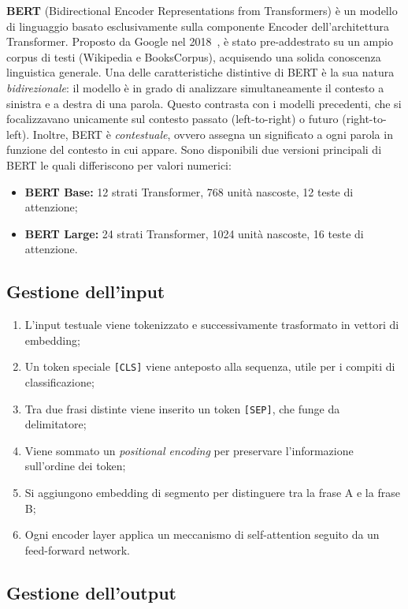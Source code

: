 \textbf{BERT} (Bidirectional Encoder Representations from Transformers) è un modello di linguaggio basato esclusivamente sulla componente Encoder dell'architettura Transformer. Proposto da Google nel 2018~\cite{devlin2018bert}, è stato pre-addestrato su un ampio corpus di testi (Wikipedia e BooksCorpus), acquisendo una solida conoscenza linguistica generale. Una delle caratteristiche distintive di BERT è la sua natura \textit{bidirezionale}: il modello è in grado di analizzare simultaneamente il contesto a sinistra e a destra di una parola. Questo contrasta con i modelli precedenti, che si focalizzavano unicamente sul contesto passato (left-to-right) o futuro (right-to-left). Inoltre, BERT è \textit{contestuale}, ovvero assegna un significato a ogni parola in funzione del contesto in cui appare. Sono disponibili due versioni principali di BERT le quali differiscono per valori numerici:
\begin{itemize}
    \item \textbf{BERT Base:} 12 strati Transformer, 768 unità nascoste, 12 teste di attenzione;
    \item \textbf{BERT Large:} 24 strati Transformer, 1024 unità nascoste, 16 teste di attenzione.
\end{itemize}

\subsection{Gestione dell'input}

\begin{enumerate}
    \item L'input testuale viene tokenizzato e successivamente trasformato in vettori di embedding;
    \item Un token speciale \texttt{[CLS]} viene anteposto alla sequenza, utile per i compiti di classificazione;
    \item Tra due frasi distinte viene inserito un token \texttt{[SEP]}, che funge da delimitatore;
    \item Viene sommato un \textit{positional encoding} per preservare l'informazione sull'ordine dei token;
    \item Si aggiungono embedding di segmento per distinguere tra la frase A e la frase B;
    \item Ogni encoder layer applica un meccanismo di self-attention seguito da un feed-forward network.
\end{enumerate}

\subsection{Gestione dell'output}

